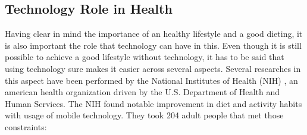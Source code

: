 \subsection{Technology Role in Health}
Having clear in mind the importance of an healthy lifestyle and a good dieting, it is also important the role that technology can have in this. Even though it is still possible to achieve a good lifestyle without technology, it has to be said that using technology sure makes it easier across several aspects. Several researches in this aspect have been performed by the National Institutes of Health (NIH) \cite{Nih}, an american health organization driven by the U.S. Department of Health and Human Services. The NIH found notable improvement in diet and activity habits with usage of mobile technology. \newline They took 204 adult people that met those constraints: 

